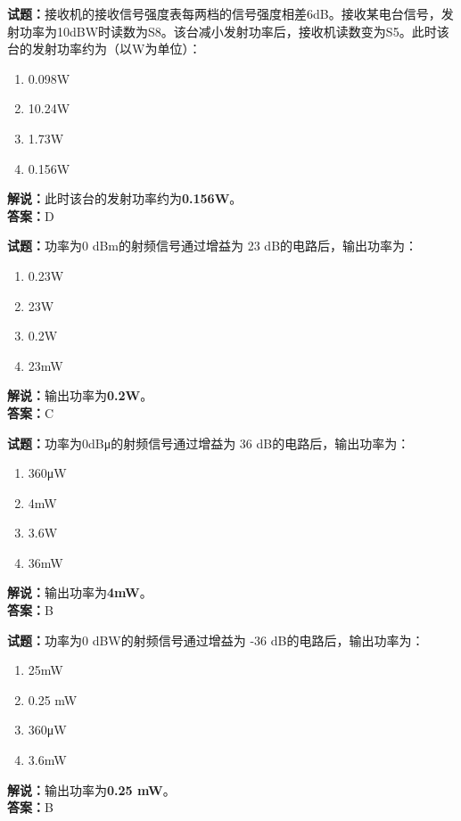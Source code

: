 \documentclass{ctexbook}
\begin{document}
\bigskip


\noindent\textbf{试题：}接收机的接收信号强度表每两档的信号强度相差6dB。接收某电台信号，发射功率为10dBW时读数为S8。该台减小发射功率后，接收机读数变为S5。此时该台的发射功率约为（以W为单位）：
\begin{enumerate}[leftmargin=3em]
\item 0.098W
\item 10.24W
\item 1.73W
\item 0.156W
\end{enumerate}
\noindent\textbf{解说：}此时该台的发射功率约为\textbf{0.156W}。\\\noindent\textbf{答案：}D





\bigskip


\noindent\textbf{试题：}功率为0 dBm的射频信号通过增益为 23 dB的电路后，输出功率为：
\begin{enumerate}[leftmargin=3em]
\item 0.23W
\item 23W
\item 0.2W
\item 23mW
\end{enumerate}
\noindent\textbf{解说：}输出功率为\textbf{0.2W}。\\\noindent\textbf{答案：}C



\bigskip


\noindent\textbf{试题：}功率为0dBμ的射频信号通过增益为 36 dB的电路后，输出功率为：
\begin{enumerate}[leftmargin=3em]
\item 360μW
\item 4mW
\item 3.6W
\item 36mW
\end{enumerate}
\noindent\textbf{解说：}输出功率为\textbf{4mW}。\\\noindent\textbf{答案：}B


\bigskip


\noindent\textbf{试题：}功率为0 dBW的射频信号通过增益为 -36 dB的电路后，输出功率为：
\begin{enumerate}[leftmargin=3em]
\item 25mW
\item 0.25 mW
\item 360μW
\item 3.6mW
\end{enumerate}
\noindent\textbf{解说：}输出功率为\textbf{0.25 mW}。\\\noindent\textbf{答案：}B
\end{document}
